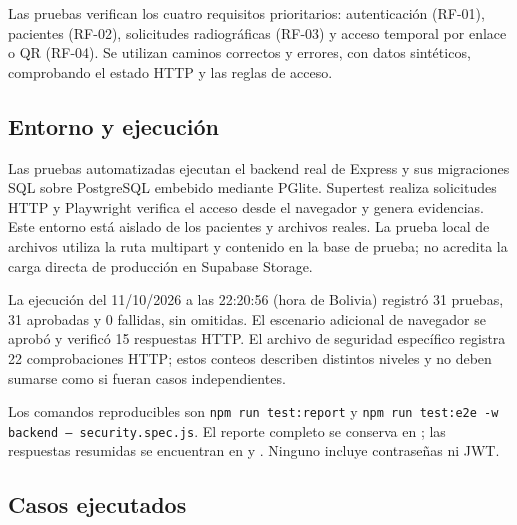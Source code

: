 Las pruebas verifican los cuatro requisitos prioritarios: autenticación
(RF-01), pacientes (RF-02), solicitudes radiográficas (RF-03) y acceso
temporal por enlace o QR (RF-04). Se utilizan caminos correctos y errores,
con datos sintéticos, comprobando el estado HTTP y las reglas de acceso.

\subsection{Entorno y ejecución}

Las pruebas automatizadas ejecutan el backend real de Express y sus
migraciones SQL sobre PostgreSQL embebido mediante PGlite. Supertest realiza
solicitudes HTTP y Playwright verifica el acceso desde el navegador y genera
evidencias. Este entorno está aislado de los pacientes y archivos reales.
La prueba local de archivos utiliza la ruta multipart y contenido en la base
de prueba; no acredita la carga directa de producción en Supabase Storage.

La ejecución del 11/10/2026 a las 22:20:56 (hora de Bolivia)
registró 31 pruebas, 31 aprobadas y 0 fallidas, sin omitidas.
El escenario adicional de navegador se aprobó y verificó 15
respuestas HTTP. El archivo de seguridad específico registra 22
comprobaciones HTTP; estos conteos describen distintos niveles y no deben sumarse
como si fueran casos independientes.

Los comandos reproducibles son \texttt{npm run test:report} y
\texttt{npm run test:e2e -w backend -- security.spec.js}.
El reporte completo se conserva en
; las respuestas resumidas se encuentran
en  y
. Ninguno incluye contraseñas ni JWT.

\subsection{Casos ejecutados}

